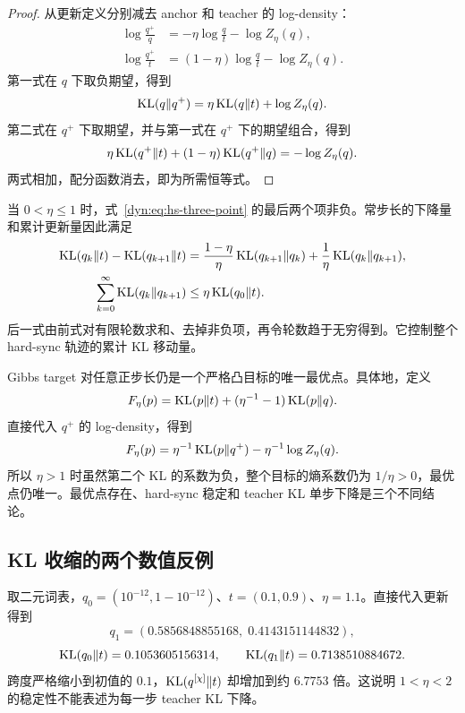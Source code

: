 \begin{proof}
从更新定义分别减去 anchor 和 teacher 的 log-density：
\begin{align*}
 \log\frac{q^+}{q}
 &=-\eta\log\frac{q}{t}-\log Z_\eta(q),\\
 \log\frac{q^+}{t}
 &=(1-\eta)\log\frac{q}{t}-\log Z_\eta(q).
\end{align*}
第一式在 $q$ 下取负期望，得到
\begin{equation*}
 \operatorname{KL}(q\Vert q^+)
 =\eta\operatorname{KL}(q\Vert t)+\log Z_\eta(q).
\end{equation*}
第二式在 $q^+$ 下取期望，并与第一式在 $q^+$ 下的期望组合，得到
\begin{equation*}
 \eta\operatorname{KL}(q^+\Vert t)
 +(1-\eta)\operatorname{KL}(q^+\Vert q)
 =-\log Z_\eta(q).
\end{equation*}
两式相加，配分函数消去，即为所需恒等式。
\end{proof}

当 $0<\eta\leq1$ 时，式~\eqref{dyn:eq:hs-three-point} 的最后两个项非负。常步长的下降量和累计更新量因此满足
\begin{align*}
 \operatorname{KL}(q_k\Vert t)-\operatorname{KL}(q_{k+1}\Vert t)
 &=\frac{1-\eta}{\eta}\operatorname{KL}(q_{k+1}\Vert q_k)
 +\frac1\eta\operatorname{KL}(q_k\Vert q_{k+1}),\\
 \sum_{k=0}^{\infty}\operatorname{KL}(q_k\Vert q_{k+1})
 &\leq\eta\operatorname{KL}(q_0\Vert t).
\end{align*}
后一式由前式对有限轮数求和、去掉非负项，再令轮数趋于无穷得到。它控制整个 hard-sync 轨迹的累计 KL 移动量。

Gibbs target 对任意正步长仍是一个严格凸目标的唯一最优点。具体地，定义
\begin{equation*}
 F_\eta(p)=\operatorname{KL}(p\Vert t)
 +(\eta^{-1}-1)\operatorname{KL}(p\Vert q).
\end{equation*}
直接代入 $q^+$ 的 log-density，得到
\begin{equation*}
 F_\eta(p)=\eta^{-1}\operatorname{KL}(p\Vert q^+)
 -\eta^{-1}\log Z_\eta(q).
\end{equation*}
所以 $\eta>1$ 时虽然第二个 KL 的系数为负，整个目标的熵系数仍为 $1/\eta>0$，最优点仍唯一。最优点存在、hard-sync 稳定和 teacher KL 单步下降是三个不同结论。

\subsection{KL 收缩的两个数值反例}

取二元词表，$q_0=(10^{-12},1-10^{-12})$、$t=(0.1,0.9)$、$\eta=1.1$。直接代入更新得到
\begin{equation*}
 q_1=(0.5856848855168,\;0.4143151144832),
\end{equation*}
\begin{equation*}
 \operatorname{KL}(q_0\Vert t)=0.1053605156314,
 \qquad\operatorname{KL}(q_1\Vert t)=0.7138510884672.
\end{equation*}
跨度严格缩小到初值的 $0.1$，$\operatorname{KL}(q^{[\chi]}\Vert t)$ 却增加到约 $6.7753$ 倍。这说明 $1<\eta<2$ 的稳定性不能表述为每一步 teacher KL 下降。

